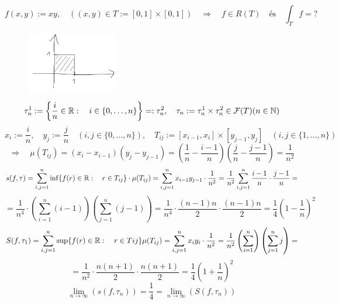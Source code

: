 \documentclass[a4paper,11.5pt]{article}
\begin{document}
	\begin{task}
		\[f(x,y):=xy,\quad ((x,y)\in T:=[0,1]\times[0,1])\quad \Rightarrow\quad f\in R(T)\quad \text{és}\quad \int_T f=?\]
		\begin{figure}[h]
			\centering
			\includegraphics[width=4cm]{kepek/01.png}
			\caption{}
		\end{figure}
		\[ \tau_n^1:=\left\{ \frac{i}{n}\in\mathbb{R}:\quad i\in\{0,\ldots,n\} \right\}=:\tau_n^2,\quad \tau_n:=\tau_n^1\times\tau_n^2\in\mathcal{F}(T)(n\in\mathbb{N}) \]
		\[ x_i:=\frac{i}{n},\quad y_j:=\frac{j}{n}\quad (i,j\in\{0,\ldots,n\}),\quad T_{ij}:=[x_{i-1},x_i]\times[y_{j-1},y_j] \quad (i,j\in\{1,\ldots,n\}) \]
		\[\Rightarrow\quad \mu(T_{ij})=(x_i-x_{i-1})(y_j-y_{j-1})=\left(\frac{1}{n}-\frac{i-1}{n}\right)\left(\frac{j}{n}-\frac{j-1}{n}\right)=\frac{1}{n^2}\]
		\[ s(f,\tau)=\sum_{i,j=1}^n\inf\{ f(r)\in\mathbb{R}:\quad r\in T_{ij} \}\cdot\mu (T_{ij})=\sum_{i,j=1}^nx_{i-1}y_{j-1}\cdot\frac{1}{n^2}=\frac{1}{n^2}\sum_{i,j=1}^n\frac{i-1}{n}\cdot\frac{j-1}{n}=\]
		\[=\frac{1}{n^4}\cdot\left(\sum_{i=1}^n(i-1)\right)\left(\sum_{j=1}^n(j-1)\right)=\frac{1}{n^4}\cdot\frac{(n-1)n}{2}\cdot\frac{(n-1)n}{2}=\frac{1}{4}\left(1-\frac{1}{n}\right)^2 \]
		\[ S(f,\tau_1)=\sum_{i,j=1}^n\sup\{ f(r)\in\mathbb{R}:\quad r\in T{ij} \}\mu(T_{ij})=\sum_{i,j=1}^nx_iy_i\cdot\frac{1}{n^2}=\frac{1}{n^2}\left(\sum_{i=1}^n\right)\left(\sum_{j=1}^nj\right)=\]
		\[=\frac{1}{n^2}\cdot\frac{n(n+1)}{2}\cdot\frac{n(n+1)}{2}=\frac{1}{4}\left(1+\frac{1}{n}\right)^2 \]
		\[ \lim_{n\to\infty}(s(f,\tau_n))=\frac{1}{4}=\lim_{n\to\infty}(S(f,\tau_n)) \]
	\end{task}
%		
%		
%		
%		
\end{document}
